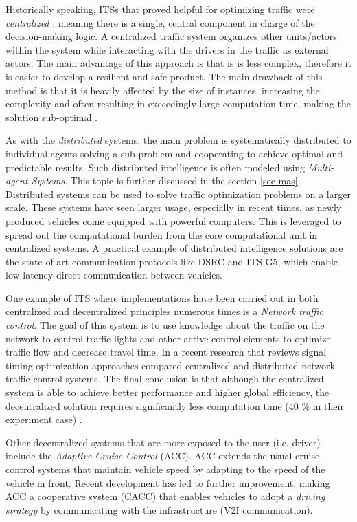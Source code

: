 \documentclass[0main.tex]{subfiles}
\begin{document}
Historically speaking, ITSs that proved helpful for optimizing traffic were
\emph{centralized} \cite{Corman2010}, meaning there is a single, central component in charge of
the decision-making logic. A centralized traffic system organizes other units/actors within the system while interacting
with the drivers in the traffic as external actors. The main advantage of this approach is that
is is less complex, therefore it is easier to develop a resilient and safe product. The main
drawback of this method is that it is heavily affected by the size of instances, increasing
the complexity and often resulting in exceedingly large computation time, making the solution
sub-optimal \cite{Corman2010}. 

As with the \emph{distributed} systems, the main problem is systematically distributed to
individual agents solving a sub-problem and cooperating to achieve optimal and predictable
results. Such distributed intelligence is often modeled using \emph{Multi-agent Systems}. This
topic is further discussed in the section \ref{sec-mas}. Distributed systems can be used to
solve traffic optimization problems on a larger scale. These systems have seen larger usage,
especially in recent times, as newly produced vehicles come equipped with powerful computers.
This is leveraged to spread out the computational burden from the core computational unit in centralized
systems. A practical example of distributed intelligence solutions are the state-of-art
communication protocols like DSRC and ITS-G5, which enable low-latency direct communication
between vehicles. 

One example of ITS where implementations have been carried out in both centralized and 
decentralized principles numerous times is a \emph{Network traffic control}. The goal of this 
system is to use knowledge about the traffic on the network to control traffic lights and other 
active control elements to optimize traffic flow and decrease travel time. In a recent research 
that reviews signal timing optimization approaches compared centralized and distributed network traffic
control systems. The final conclusion is that although the centralized system is able
to achieve better performance and higher global efficiency, the decentralized solution requires
significantly less computation time (40 \% in their experiment case) \cite{Chow2019}.

Other decentralized systems that are more exposed to the user (i.e. driver) include the 
\emph{Adaptive Cruise Control} (ACC). ACC extends the usual cruise control systems 
that maintain vehicle speed by adapting to the speed of the vehicle in front.  
Recent development has led to further improvement, making ACC a cooperative system (CACC) that 
enables vehicles to adopt a \emph{driving strategy} by communicating with the infrastructure (V2I 
communication).
\end{document}
